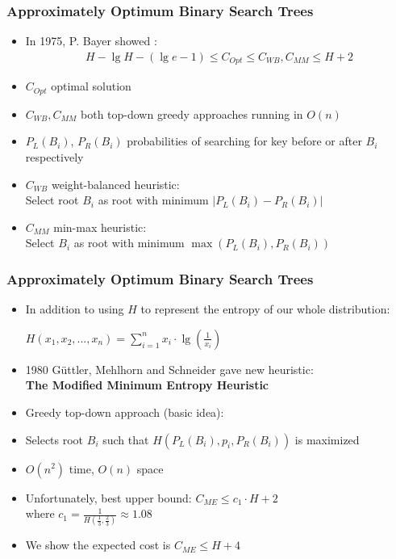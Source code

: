 \documentclass[]{beamer}
\theoremstyle{plain}
\begin{document}
\begin{frame} \frametitle{Approximately Optimum Binary Search Trees}


\begin{itemize}
\item In 1975, P. Bayer showed \cite{bayer1975improved}:
\begin{align*}
H-\lg H-(\lg e-1) \leq C_{Opt} \leq C_{WB}, C_{MM} \leq H + 2
\end{align*}

\item $C_{Opt}$ optimal solution

\item $C_{WB}, C_{MM}$ both top-down greedy approaches running in $O(n)$

\item $P_L(B_i)$,  $P_R(B_i)$ probabilities of searching for key before or after $B_i$ respectively

\item $C_{WB}$ weight-balanced heuristic: \\
Select root $B_i$ as root with minimum $|P_L(B_i)-P_R(B_i)|$

\item $C_{MM}$ min-max heuristic:  \\
Select $B_i$ as root with minimum $\max(P_L(B_i), P_R(B_i))$


\end{itemize}

\end{frame}

\begin{frame} \frametitle{Approximately Optimum Binary Search Trees}

\begin{itemize}

\item In addition to using $H$ to represent the entropy of our whole distribution:
\begin{center}
$H(x_1,x_2,...,x_n) = \sum_{i=1}^{n} x_i\cdot\lg(\frac{1}{x_i})$
\end{center}

\item 1980 G{\"u}ttler, Mehlhorn and Schneider gave new heuristic: \\
\textbf{The Modified Minimum Entropy Heuristic}

\item Greedy top-down approach (basic idea):

\item Selects root $B_i$ such that $H(P_L(B_i), p_i, P_R(B_i))$ is maximized

\item $O(n^2)$ time, $O(n)$ space

\item Unfortunately, best upper bound: $C_{ME} \leq c_1\cdot H+2$ \\ where $c_1=\frac{1}{H(\frac{1}{3}, \frac{2}{3})} \approx 1.08$ 

\item We show the expected cost is $C_{ME} \leq H+4$


\end{itemize}

\end{frame}
\end{document}
